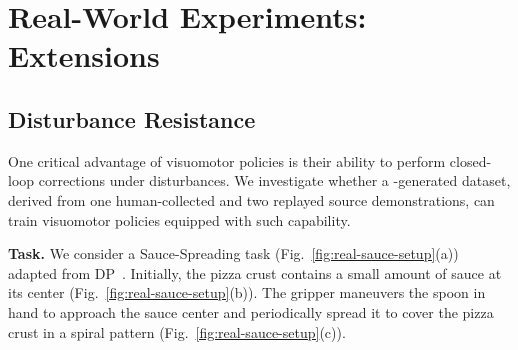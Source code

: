 \section{Real-World Experiments: Extensions}

\subsection{Disturbance Resistance}


One critical advantage of visuomotor policies is their ability to perform closed-loop corrections under disturbances. We investigate whether a \method-generated dataset, derived from one human-collected and two replayed source demonstrations, can train visuomotor policies equipped with such capability.

\vspace{0.2cm} \noindent\textbf{Task.}
We consider a Sauce-Spreading task (Fig.~\ref{fig:real-sauce-setup}(a)) adapted from DP~\cite{chi2023diffusion_policy}. 
Initially, the pizza crust contains a small amount of sauce at its center (Fig.~\ref{fig:real-sauce-setup}(b)). 
The gripper maneuvers the spoon in hand to approach the sauce center and periodically spread it to cover the pizza crust in a spiral pattern (Fig.~\ref{fig:real-sauce-setup}(c)).


